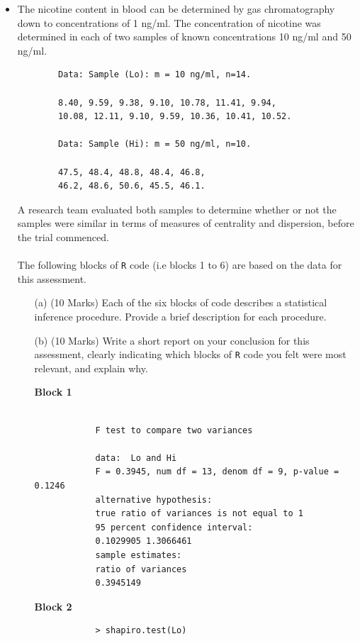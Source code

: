\documentclass[a4paper,12pt]{article}
\begin{document}
\begin{itemize}
	\item The nicotine content in blood can be determined by gas chromatography down to concentrations of 1 ng/ml. The concentration of nicotine was determined in each of two samples of known concentrations 10 ng/ml and 50 ng/ml.
	\begin{framed}
		\begin{verbatim}
		Data: Sample (Lo): m = 10 ng/ml, n=14.
		
		8.40, 9.59, 9.38, 9.10, 10.78, 11.41, 9.94, 
		10.08, 12.11, 9.10, 9.59, 10.36, 10.41, 10.52.
		
		Data: Sample (Hi): m = 50 ng/ml, n=10.
		
		47.5, 48.4, 48.8, 48.4, 46.8, 
		46.2, 48.6, 50.6, 45.5, 46.1.
		\end{verbatim}
	\end{framed}
	A research team evaluated both samples to determine whether or not the samples were similar in terms of measures of centrality and dispersion, before the trial commenced.  \\  \\ The following blocks of \texttt{R} code (i.e blocks 1 to 6) are based on the data for this assessment. \\ 
	\begin{itemize}
		\item[(a)] (10 Marks) Each of the six blocks of code describes a statistical inference procedure. Provide a brief description for each procedure.
		\item[(b)] (10 Marks) Write a short report on your conclusion for this assessment, clearly indicating which blocks of \texttt{R} code you felt were most relevant, and explain why. 
	\end{itemize}
	
	\begin{itemize}
		\item[\textbf{Block 1}]
		\begin{framed}
			\begin{verbatim}
			
			F test to compare two variances
			
			data:  Lo and Hi
			F = 0.3945, num df = 13, denom df = 9, p-value = 0.1246
			alternative hypothesis: 
			true ratio of variances is not equal to 1
			95 percent confidence interval:
			0.1029905 1.3066461
			sample estimates:
			ratio of variances 
			0.3945149
			\end{verbatim}
		\end{framed}
	\newpage
		\item[\textbf{Block 2}]
		\begin{framed}
			\begin{verbatim}
			> shapiro.test(Lo)
			

\end{verbatim}
\end{framed}
\end{itemize}
\end{itemize}
\end{document}
